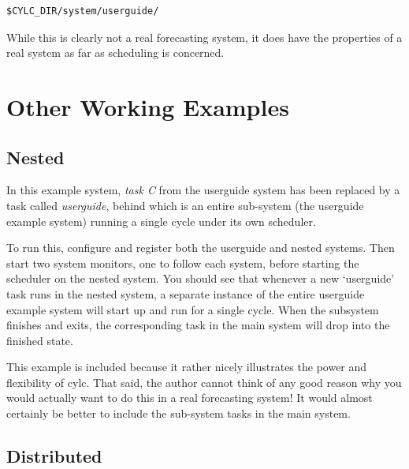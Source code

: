 \documentclass[11pt,a4paper]{article}
\begin{document}
\begin{lstlisting}
$CYLC_DIR/system/userguide/
\end{lstlisting}

 While this is clearly not a real forecasting system, it does have the
 properties of a real system as far as scheduling is concerned.  




\pagebreak


\section{Other Working Examples}
\label{OtherWorkingExamples}

\subsection{Nested}

In this example system, {\em task C} from the userguide system has been
replaced by a task called {\em userguide}, behind which is an entire
sub-system (the userguide example system) running a single cycle under
its own scheduler.

To run this, configure and register both the userguide and nested
systems. Then start two system monitors, one to follow each system,
before starting the scheduler on the nested system. You should see that 
whenever a new `userguide' task runs in the nested system, a separate
instance of the entire userguide example system will start up and run
for a single cycle. When the subsystem finishes and exits, the
corresponding task in the main system will drop into the finished state.

This example is included because it rather nicely illustrates the power
and flexibility of cylc. That said, the author cannot think of any good
reason why you would actually want to do this in a real forecasting
system! It would almost certainly be better to include the sub-system
tasks in the main system.


\subsection{Distributed}
\label{Distributed}
\end{document}
